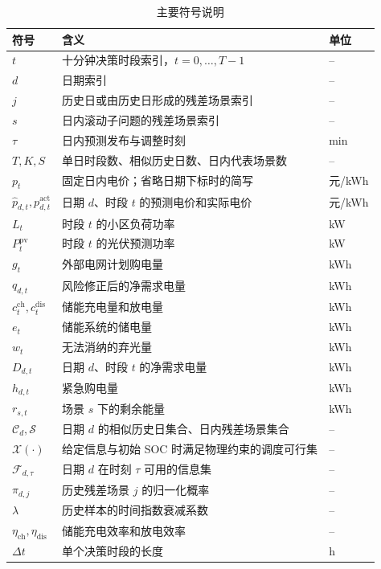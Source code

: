 \documentclass[withoutpreface,bwprint]{cumcmthesis}
\begin{document}
\begin{table}[H]
  \centering
  \caption{主要符号说明}
  \label{tab:symbols}
  \begin{tabularx}{\textwidth}{C{0.18\textwidth} L L}
    \toprule
    符号 & 含义 & 单位 \\
    \midrule
    $t$ & 十分钟决策时段索引，$t=0,\ldots,T-1$ & -- \\
    $d$ & 日期索引 & -- \\
    $j$ & 历史日或由历史日形成的残差场景索引 & -- \\
    $s$ & 日内滚动子问题的残差场景索引 & -- \\
    $\tau$ & 日内预测发布与调整时刻 & min \\
    $T,K,S$ & 单日时段数、相似历史日数、日内代表场景数 & -- \\
    $p_t$ & 固定日内电价；省略日期下标时的简写 & 元/kWh \\
    $\widehat p_{d,t},p_{d,t}^{\mathrm{act}}$ & 日期 $d$、时段 $t$ 的预测电价和实际电价 & 元/kWh \\
    $L_t$ & 时段 $t$ 的小区负荷功率 & \si{kW} \\
    $P_t^{\mathrm{pv}}$ & 时段 $t$ 的光伏预测功率 & \si{kW} \\
    $g_t$ & 外部电网计划购电量 & \si{kWh} \\
    $q_{d,t}$ & 风险修正后的净需求电量 & \si{kWh} \\
    $c_t^{\mathrm{ch}},c_t^{\mathrm{dis}}$ & 储能充电量和放电量 & \si{kWh} \\
    $e_t$ & 储能系统的储电量 & \si{kWh} \\
    $w_t$ & 无法消纳的弃光量 & \si{kWh} \\
    $D_{d,t}$ & 日期 $d$、时段 $t$ 的净需求电量 & \si{kWh} \\
    $h_{d,t}$ & 紧急购电量 & \si{kWh} \\
    $r_{s,t}$ & 场景 $s$ 下的剩余能量 & \si{kWh} \\
    $\mathcal C_d,\mathcal S$ & 日期 $d$ 的相似历史日集合、日内残差场景集合 & -- \\
    $\mathcal X(\cdot)$ & 给定信息与初始 SOC 时满足物理约束的调度可行集 & -- \\
    $\mathcal F_{d,\tau}$ & 日期 $d$ 在时刻 $\tau$ 可用的信息集 & -- \\
    $\pi_{d,j}$ & 历史残差场景 $j$ 的归一化概率 & -- \\
    $\lambda$ & 历史样本的时间指数衰减系数 & -- \\
    $\eta_{\mathrm{ch}},\eta_{\mathrm{dis}}$ & 储能充电效率和放电效率 & -- \\
    $\Delta t$ & 单个决策时段的长度 & \si{h} \\
    \bottomrule
  \end{tabularx}
\end{table}
\end{document}
